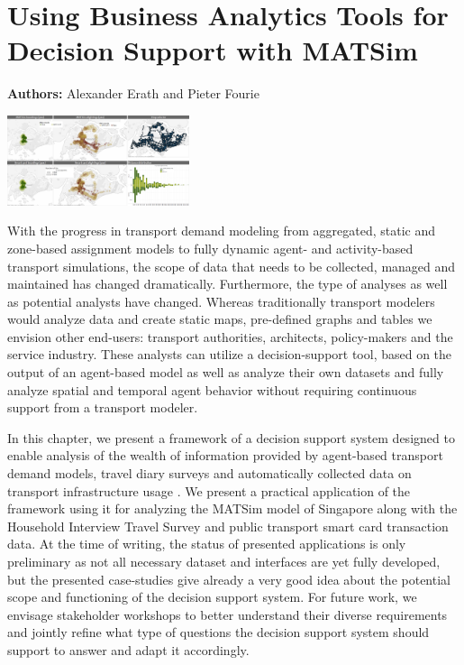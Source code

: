 \chapter{Using Business Analytics Tools for Decision Support with MATSim}
\label{ch:businessanalytics}

\hfill \textbf{Authors:} Alexander Erath and Pieter Fourie

\begin{center} \includegraphics[width=0.4\textwidth, angle=0]{extending/figures/businessanalytics/tableau.png} \end{center}


With the progress in transport demand modeling from aggregated, static and zone-based
assignment models to fully dynamic agent- and activity-based transport simulations, the scope of
data that needs to be collected, managed and maintained has changed dramatically. Furthermore,
the type of analyses as well as potential analysts have changed. Whereas traditionally transport
modelers would analyze data and create static maps, pre-defined graphs and tables we envision
other end-users: transport authorities, architects, policy-makers and the service industry. These
analysts can utilize a decision-support tool, based on the output of an agent-based model as well
as analyze their own datasets and fully analyze spatial and temporal agent behavior without
requiring continuous support from a transport modeler.

In this chapter, we present a framework of a decision support system designed to enable analysis
of the wealth of information provided by agent-based transport demand models, travel diary
surveys and automatically collected data on transport infrastructure usage \citep[see also][]{ErathEtAl_unpub_EASTS_2013, ErathEtAl_unpub_STRC_2013}. We present a practical application of the framework using it for analyzing the MATSim model of Singapore along with
the Household Interview Travel Survey and public transport smart card transaction data. At
the time of writing, the status of presented applications is only preliminary as not all necessary
dataset and interfaces are yet fully developed, but the presented case-studies give already a very
good idea about the potential scope and functioning of the decision support system. For future
work, we envisage stakeholder workshops to better understand their diverse requirements and
jointly refine what type of questions the decision support system should support to answer and
adapt it accordingly.

